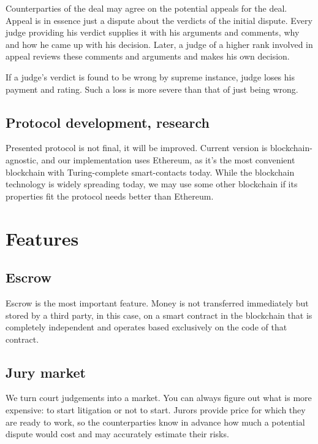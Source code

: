 \documentclass[12pt]{article}
\begin{document}
Counterparties of the deal may agree on the potential appeals for the deal. Appeal is in essence just a dispute about the
verdicts of the initial dispute. Every judge providing his verdict supplies it with his arguments and comments, why and
how he came up with his decision. Later, a judge of a higher rank involved in appeal reviews these comments and
arguments and makes his own decision.

If a judge's verdict is found to be wrong by supreme instance, judge loses his payment and rating. Such a loss is more
severe than that of just being wrong.




\subsection{Protocol development, research}
Presented protocol is not final, it will be improved. Current version is blockchain-agnostic, and our implementation uses Ethereum, as it’s
the most convenient blockchain with Turing-complete smart-contacts today. While the blockchain technology is widely spreading today, we may
use some other blockchain if its properties fit the protocol needs better than Ethereum.

\section{Features}
\subsection{Escrow}
Escrow is the most important feature. Money is not transferred immediately but stored by a third party, in this case, on a smart contract in
the blockchain that is completely independent and operates based exclusively on the code of that contract.

\subsection{Jury market}
We turn court judgements into a market. You can always figure out what is more expensive: to start litigation or not to start. Jurors
provide price for which they are ready to work, so the counterparties know in advance how much a potential dispute would cost and may
accurately estimate their risks.
\end{document}
